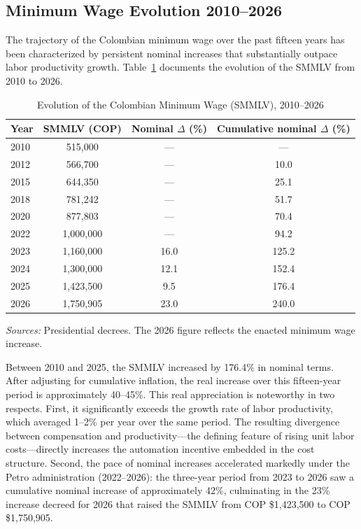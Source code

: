 \documentclass{article}
\begin{document}
\subsection{Minimum Wage Evolution 2010--2026}
\label{subsec:min_wage}

The trajectory of the Colombian minimum wage over the past fifteen years has been characterized by persistent nominal increases that substantially outpace labor productivity growth. Table~\ref{tab:min_wage} documents the evolution of the SMMLV from 2010 to 2026.

\begin{table}[H]
\centering
\caption{Evolution of the Colombian Minimum Wage (SMMLV), 2010--2026}
\label{tab:min_wage}
\begin{threeparttable}
\begin{tabular}{lccc}
\toprule
\textbf{Year} & \textbf{SMMLV (COP)} & \textbf{Nominal $\Delta$ (\%)} & \textbf{Cumulative nominal $\Delta$ (\%)} \\
\midrule
2010 & 515,000 & --- & --- \\
2012 & 566,700 & --- & 10.0 \\
2015 & 644,350 & --- & 25.1 \\
2018 & 781,242 & --- & 51.7 \\
2020 & 877,803 & --- & 70.4 \\
2022 & 1,000,000 & --- & 94.2 \\
2023 & 1,160,000 & 16.0 & 125.2 \\
2024 & 1,300,000 & 12.1 & 152.4 \\
2025 & 1,423,500 & 9.5 & 176.4 \\
2026 & 1,750,905 & 23.0 & 240.0 \\
\bottomrule
\end{tabular}
\begin{tablenotes}
\small
\item \textit{Sources:} Presidential decrees. The 2026 figure reflects the enacted minimum wage increase.
\end{tablenotes}
\end{threeparttable}
\end{table}

Between 2010 and 2025, the SMMLV increased by 176.4\% in nominal terms. After adjusting for cumulative inflation, the real increase over this fifteen-year period is approximately 40--45\%. This real appreciation is noteworthy in two respects. First, it significantly exceeds the growth rate of labor productivity, which averaged 1--2\% per year over the same period. The resulting divergence between compensation and productivity---the defining feature of rising unit labor costs---directly increases the automation incentive embedded in the cost structure. Second, the pace of nominal increases accelerated markedly under the Petro administration (2022--2026): the three-year period from 2023 to 2026 saw a cumulative nominal increase of approximately 42\%, culminating in the 23\% increase decreed for 2026 that raised the SMMLV from COP \$1,423,500 to COP \$1,750,905.
\end{document}
